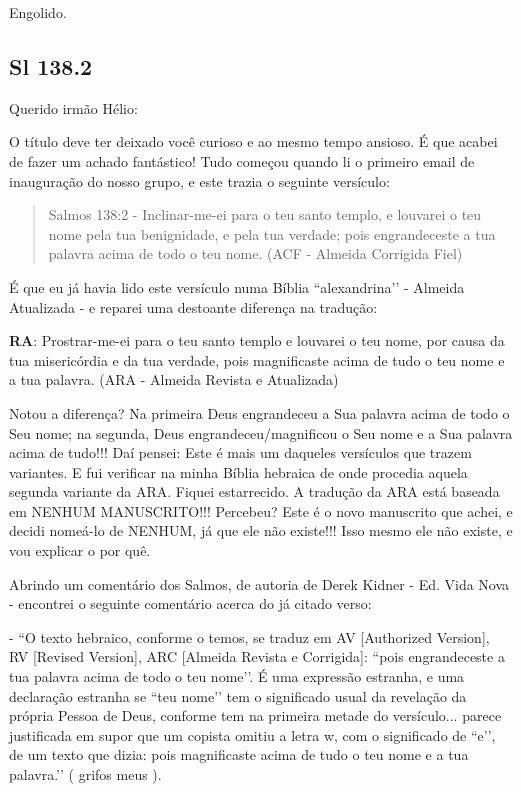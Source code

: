 Engolido.

\subsection*{Sl 138.2} 
Querido irmão Hélio:

O título deve ter deixado você curioso e ao mesmo tempo ansioso. É que acabei de fazer um achado fantástico! Tudo começou quando li o primeiro email de inauguração do nosso grupo, e este trazia o seguinte versículo:
 \begin{quote}
    \small
Salmos 138:2 - Inclinar-me-ei para o teu santo templo, e louvarei o teu nome pela tua benignidade, e pela tua verdade; pois engrandeceste a tua palavra acima de todo o teu nome. (ACF - Almeida Corrigida Fiel)
\end{quote}

É que eu já havia lido este versículo numa Bíblia ``alexandrina’’ - Almeida Atualizada - e reparei uma destoante diferença na tradução:

\textbf{RA}: Prostrar-me-ei para o teu santo templo e louvarei o teu nome, por causa da tua misericórdia e da tua verdade, pois magnificaste acima de tudo o teu nome e a tua palavra. (ARA - Almeida Revista e Atualizada)

Notou a diferença? Na primeira Deus engrandeceu a Sua palavra acima de todo o Seu nome; na segunda, Deus engrandeceu/magnificou o Seu nome e a Sua palavra acima de tudo!!! Daí pensei: Este é mais um daqueles versículos que trazem variantes. E fui verificar na minha Bíblia hebraica de onde procedia aquela segunda variante da ARA. Fiquei estarrecido. A tradução da ARA está baseada em NENHUM MANUSCRITO!!! Percebeu? Este é o novo manuscrito que achei, e decidi nomeá-lo de NENHUM, já que ele não existe!!! Isso mesmo ele não existe, e vou explicar o por quê.

Abrindo um comentário dos Salmos, de autoria de Derek Kidner - Ed. Vida Nova - encontrei o seguinte comentário acerca do já citado verso:

- ``O texto hebraico, conforme o temos, se traduz em AV [Authorized Version], RV [Revised Version], ARC [Almeida Revista e Corrigida]: ``pois engrandeceste a tua palavra acima de todo o teu nome’’. É uma expressão estranha, e uma declaração estranha se ``teu nome’’ tem o significado usual da revelação da própria Pessoa de Deus, conforme tem na primeira metade do versículo... parece justificada em supor que um copista omitiu a letra w, com o significado de ``e’’, de um texto que dizia: pois magnificaste acima de tudo o teu nome e a tua palavra.’’ ( grifos meus ).

